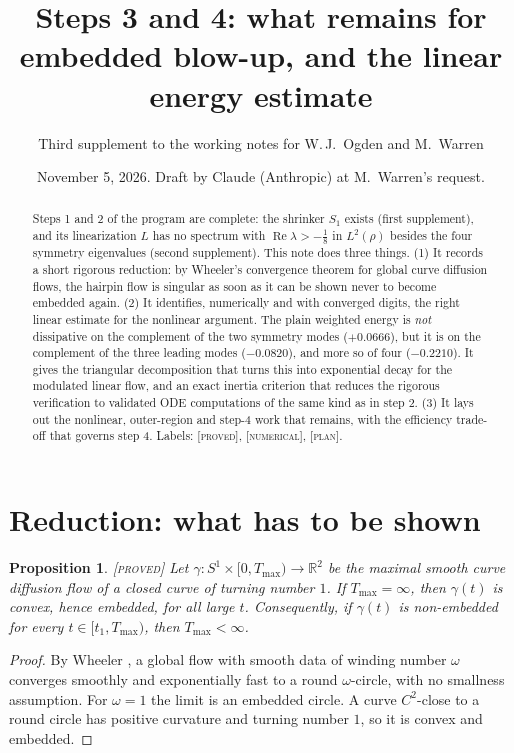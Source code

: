 \documentclass[11pt]{amsart}
\title{Steps 3 and 4: what remains for embedded blow-up, and the linear energy estimate}
\author{Third supplement to the working notes for W.\,J.~Ogden and M.~Warren}
\date{November 5, 2026. Draft by Claude (Anthropic) at M.~Warren's request.}
\newtheorem{proposition}[theorem]{Proposition}
\theoremstyle{remark}
\newcommand{\R}{\mathbb{R}}
\newcommand{\re}{\operatorname{Re}}
\newcommand{\lab}[1]{\textup{\textsc{[#1]}}}
\begin{document}
\begin{abstract}
Steps 1 and 2 of the program are complete: the shrinker $S_1$ exists (first supplement), and its linearization $L$ has no spectrum with $\re\lambda>-\frac18$ in $L^2(\rho)$ besides the four symmetry eigenvalues (second supplement). This note does three things. (1) It records a short rigorous reduction: by Wheeler's convergence theorem for global curve diffusion flows, the hairpin flow is singular as soon as it can be shown never to become embedded again. (2) It identifies, numerically and with converged digits, the right linear estimate for the nonlinear argument. The plain weighted energy is \emph{not} dissipative on the complement of the two symmetry modes ($+0.0666$), but it is on the complement of the three leading modes ($-0.0820$), and more so of four ($-0.2210$). It gives the triangular decomposition that turns this into exponential decay for the modulated linear flow, and an exact inertia criterion that reduces the rigorous verification to validated ODE computations of the same kind as in step 2. (3) It lays out the nonlinear, outer-region and step-4 work that remains, with the efficiency trade-off that governs step 4. Labels: \lab{proved}, \lab{numerical}, \lab{plan}.
\end{abstract}
\maketitle



\section{Reduction: what has to be shown}

\begin{proposition}\label{prop:wheeler}\lab{proved}
Let $\gamma:S^1\times[0,T_{\max})\to\R^2$ be the maximal smooth curve diffusion flow of a closed curve of turning number $1$. If $T_{\max}=\infty$, then $\gamma(t)$ is convex, hence embedded, for all large $t$. Consequently, if $\gamma(t)$ is non-embedded for every $t\in[t_1,T_{\max})$, then $T_{\max}<\infty$.
\end{proposition}
\begin{proof}
By Wheeler \cite[Thm.~1.1]{Wh22}, a global flow with smooth data of winding number $\omega$ converges smoothly and exponentially fast to a round $\omega$-circle, with no smallness assumption. For $\omega=1$ the limit is an embedded circle. A curve $C^2$-close to a round circle has positive curvature and turning number $1$, so it is convex and embedded.
\end{proof}
\end{document}
